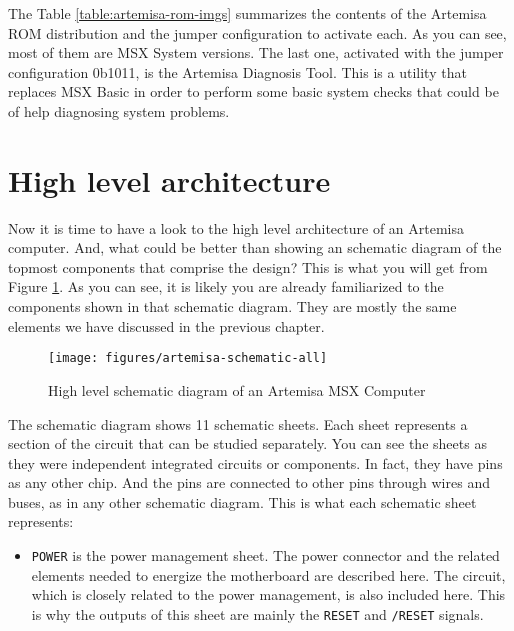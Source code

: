 The Table \ref{table:artemisa-rom-imgs} summarizes the contents of the Artemisa ROM distribution and the jumper configuration to activate each. As you can see, most of them are MSX System versions. The last one, activated with the jumper configuration 0b1011, is the Artemisa Diagnosis Tool. This is a utility that replaces MSX Basic in order to perform some basic system checks that could be of help diagnosing system problems.

\section{High level architecture}

Now it is time to have a look to the high level architecture of an Artemisa computer. And, what could be better than showing an schematic diagram of the topmost components that comprise the design? This is what you will get from Figure \ref{fig:artemisa-arch-overview}. As you can see, it is likely you are already familiarized to the components shown in that schematic diagram. They are mostly the same elements we have discussed in the previous chapter.\\

\begin{figure}
  \centering
  \texttt{[image: figures/artemisa-schematic-all]}
  \caption{High level schematic diagram of an Artemisa MSX Computer}
  \label{fig:artemisa-arch-overview}
\end{figure}

The schematic diagram shows 11 schematic sheets. Each sheet represents a section of the circuit that can be studied separately. You can see the sheets as they were independent integrated circuits or components. In fact, they have pins as any other chip. And the pins are connected to other pins through wires and buses, as in any other schematic diagram. This is what each schematic sheet represents:

\begin{itemize}
  \item {\tt POWER} is the power management sheet. The power connector and the related elements needed to energize the motherboard are described here. The  circuit, which is closely related to the power management, is also included here. This is why the outputs of this sheet are mainly the {\tt RESET} and {\tt /RESET} signals.
\end{itemize}


